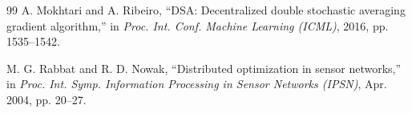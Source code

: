 \documentclass[conference]{IEEEtran}
\begin{document}
\begin{thebibliography}{99}
 A. Mokhtari and A. Ribeiro, ``DSA: Decentralized double stochastic averaging gradient algorithm,'' in \emph{Proc. Int. Conf. Machine Learning (ICML)}, 2016, pp. 1535--1542.

 M. G. Rabbat and R. D. Nowak, ``Distributed optimization in sensor networks,'' in \emph{Proc. Int. Symp. Information Processing in Sensor Networks (IPSN)}, Apr. 2004, pp. 20--27.

\end{thebibliography}


\end{document}
